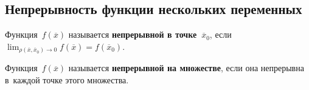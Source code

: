 \subsection{Непрерывность функции нескольких переменных}
 Функция~$f(\overline x)$ называется \textbf{непрерывной в точке~$\overline x_0$}, если
$\displaystyle \lim_{\rho(\overline x, \overline x_0) \to 0} f(\overline x) = f(\overline x_0)$.

Функция~$f(\overline x)$ называется \textbf{непрерывной на множестве}, если она непрерывна в~каждой точке этого множества.